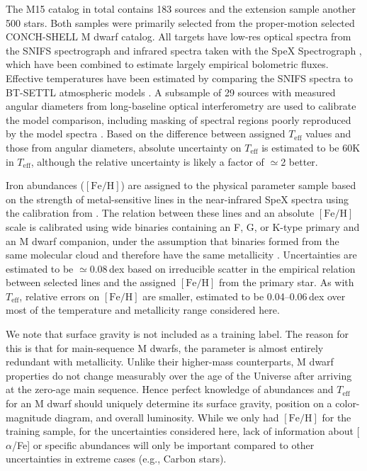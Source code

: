 \documentclass[twocolumn]{aastex62}
\newcommand{\teff}{T_{\mathrm{eff}}}
\newcommand{\feh}{[{\mathrm{Fe}/\mathrm{H}}]}
\begin{document}
The M15 catalog in total contains 183 sources and the extension sample another 500 stars. Both samples were primarily selected from the proper-motion selected CONCH-SHELL \citep{Gaidos:2013} M dwarf catalog. All targets have low-res optical spectra from the SNIFS spectrograph \citep{Lantz:2004} and infrared spectra taken with the SpeX Spectrograph \citep{Rayner:2003}, which have been combined to estimate largely empirical bolometric fluxes. Effective temperatures have been estimated by comparing the SNIFS spectra to BT-SETTL atmospheric models \citep{Allard:2011}. A subsample of 29 sources with measured angular diameters from long-baseline optical interferometry \citep{Boyajian:2012} are used to calibrate the model comparison, including masking of spectral regions poorly reproduced by the model spectra \citep{Mann:2013c}. Based on the difference between assigned $\teff$ values and those from angular diameters, absolute uncertainty on $\teff$ is estimated to be 60K in $\teff$, although the relative uncertainty is likely a factor of $\simeq$2 better.

Iron abundances ($\feh$) are assigned to the physical parameter sample based on the strength of metal-sensitive lines in the near-infrared SpeX spectra \citep{RojasAyala:2010} using the calibration from \citet{Mann:2013a}. The relation between these lines and an absolute $\feh$ scale is calibrated using wide binaries containing an F, G, or K-type primary and an M dwarf companion, under the assumption that binaries formed from the same molecular cloud and therefore have the same metallicity \citep{Bonfils:2005}. Uncertainties are estimated to be $\simeq$0.08\,dex based on irreducible scatter in the empirical relation between selected lines and the assigned $\feh$ from the primary star. As with $\teff$, relative errors on $\feh$ are smaller, estimated to be 0.04--0.06\,dex over most of the temperature and metallicity range considered here.

We note that surface gravity is not included as a training label. The reason for this is that for main-sequence M dwarfs, the parameter is almost entirely redundant with metallicity. Unlike their higher-mass counterparts, M dwarf properties do not change measurably over the age of the Universe after arriving at the zero-age main sequence. Hence perfect knowledge of abundances and $\teff$ for an M dwarf should uniquely determine its surface gravity, position on a color-magnitude diagram, and overall luminosity. While we only had $\feh$ for the training sample, for the uncertainties considered here, lack of information about [$\alpha$/Fe] or specific abundances will only be important compared to other uncertainties in extreme cases (e.g., Carbon stars).  
\end{document}
